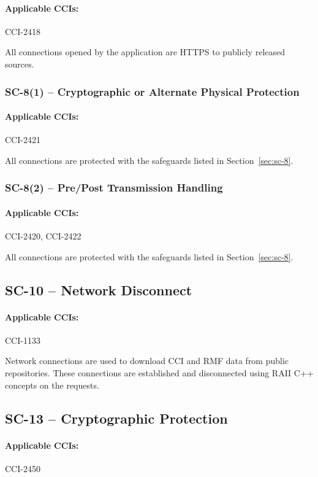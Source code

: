 \documentclass[letterpaper, 10pt, twoside]{article}
\begin{document}
\paragraph{Applicable CCIs:} CCI-2418

All connections opened by the application are HTTPS to publicly released sources.

\subsubsection{SC-8(1) -- Cryptographic or Alternate Physical Protection}

\paragraph{Applicable CCIs:} CCI-2421

All connections are protected with the safeguards listed in Section~\ref{sec:sc-8}.

\subsubsection{SC-8(2) -- Pre/Post Transmission Handling}

\paragraph{Applicable CCIs:} CCI-2420, CCI-2422

All connections are protected with the safeguards listed in Section~\ref{sec:sc-8}.

\subsection{SC-10 -- Network Disconnect}

\paragraph{Applicable CCIs:} CCI-1133

Network connections are used to download CCI and RMF data from public repositories. These connections are established and disconnected using RAII C++ concepts on the requests.

\subsection{SC-13 -- Cryptographic Protection}

\paragraph{Applicable CCIs:} CCI-2450
\end{document}
